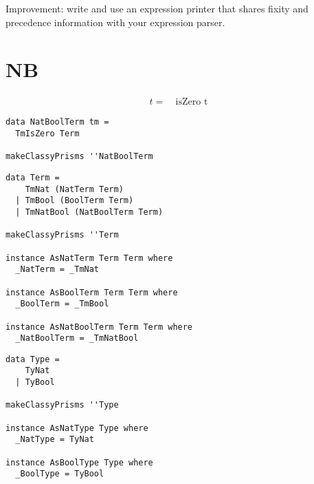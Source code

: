 \documentclass{beamer}
\begin{document}
\begin{frame}[c]
  \begin{center}
Improvement: write and use an expression printer that shares fixity and
precedence information with your expression parser.
  \end{center}
\end{frame}

\section{NB}

\begin{frame}[c]
  \begin{displaymath}
    \begin{aligned}
t =& \ \text{isZero t}
    \end{aligned}
  \end{displaymath}
\end{frame}

\begin{frame}[fragile]
  \begin{verbatim}
data NatBoolTerm tm =
  TmIsZero Term

makeClassyPrisms ''NatBoolTerm
  \end{verbatim}
\end{frame} 

\begin{frame}[fragile]
  \begin{verbatim}
data Term =
    TmNat (NatTerm Term)
  | TmBool (BoolTerm Term)
  | TmNatBool (NatBoolTerm Term)

makeClassyPrisms ''Term

instance AsNatTerm Term Term where
  _NatTerm = _TmNat

instance AsBoolTerm Term Term where
  _BoolTerm = _TmBool

instance AsNatBoolTerm Term Term where
  _NatBoolTerm = _TmNatBool
  \end{verbatim}
\end{frame} 

\begin{frame}[fragile]
\begin{verbatim}
data Type =
    TyNat
  | TyBool

makeClassyPrisms ''Type

instance AsNatType Type where
  _NatType = TyNat

instance AsBoolType Type where
  _BoolType = TyBool
\end{verbatim}
\end{frame}
\end{document}
